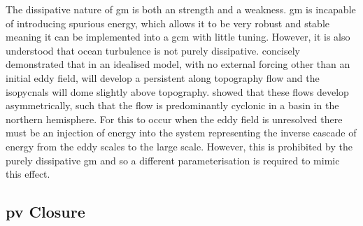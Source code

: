 \documentclass[12pt,a4paper]{report}
\begin{document}
        The dissipative nature of \gls{gm} is both an strength and a
         weakness. \gls{gm} is incapable of introducing spurious energy,
         which allows it to be very robust and stable meaning it can be implemented 
         into a \gls{gcm} with little tuning. However, it is also understood that
         ocean turbulence is not purely dissipative.
          \cite{adcock2000interactions} concisely demonstrated that
         in an idealised model, with no external forcing other
         than an initial eddy field, will develop a persistent along
         topography flow and the isopycnals will dome slightly above topography.
          \cite{nost2008asymmetry} showed that these
         flows develop asymmetrically, such that the flow is 
         predominantly cyclonic in
         a basin in the northern hemisphere. For this to occur 
         when the eddy field is unresolved there must be an 
         injection of energy into the system representing the 
         inverse cascade of energy from the eddy scales to the large scale.
         However, this is prohibited by the purely dissipative \gls{gm}
         and so a different parameterisation is required to mimic this
         effect.
         
         
         
         \subsection{\gls{pv} Closure}
         
\end{document}
